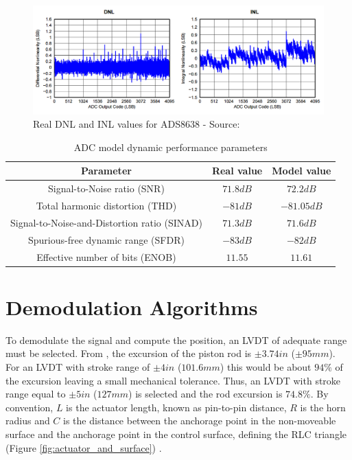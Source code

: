 \documentclass[conference]{IEEEtran}
\begin{document}
\begin{figure}[h!]
\centering
\includegraphics[scale=0.22]{pics/models/real_inl_dnl.png}
\caption{Real DNL and INL values for ADS8638 - Source: \cite{ads8638}}
\label{fig:real_dnl_inl_x}
\end{figure}

\begin{table}[h!]
\centering
\caption{ADC model dynamic performance parameters}
\label{tab:adc_perf_param}
\begin{tabular}{|c|c|c|}
\hline
Parameter & Real value & Model value \\ \hline
Signal-to-Noise ratio (SNR) & $71.8dB$ & $72.2dB$ \\ \hline
Total harmonic distortion (THD) & $-81dB$ & $-81.05dB$  \\ \hline
Signal-to-Noise-and-Distortion ratio (SINAD) & $71.3dB$ & $71.6dB$ \\ \hline
Spurious-free dynamic range (SFDR) & $-83dB$ & $-82dB$ \\ \hline
Effective number of bits (ENOB) & $11.55$ & $11.61$ \\ \hline
\end{tabular}
\end{table}	

\section{Demodulation Algorithms}

To demodulate the signal and compute the position, an LVDT of adequate range must be selected. From \cite{Ballesteros}, the excursion of the piston rod is $\pm 3.74 in$ ($\pm 95mm$). For an LVDT with stroke range of $\pm 4in$ ($ 101.6mm$) this would be about $94\%$ of the excursion leaving a small mechanical tolerance. Thus, an LVDT with stroke range equal to $\pm 5in$ ($127mm$) is selected and the rod excursion is $74.8 \%$. By convention, $L$ is the actuator length, known as pin-to-pin distance, $R$ is the horn radius and $C$ is the distance between the anchorage point in the non-moveable surface and the anchorage point in the control surface, defining the RLC triangle (Figure \ref{fig:actuator_and_surface}) \cite{Ballesteros}.
\end{document}
